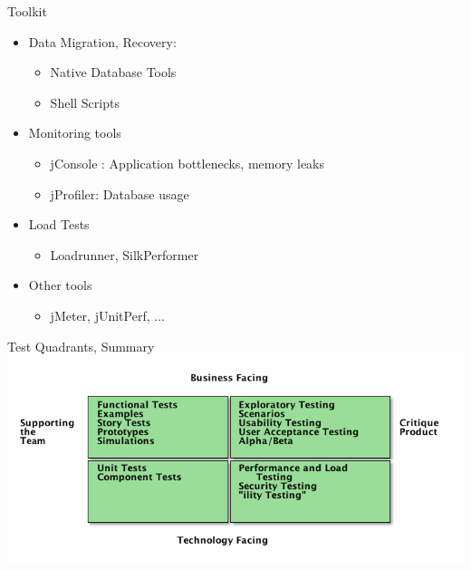 \documentclass[10pt,t,a4paper]{beamer}
\begin{document}
\begin{frame}[label=sec-14]{Toolkit}
\begin{itemize}
\item Data Migration, Recovery:
\begin{itemize}
\item Native Database Tools
\item Shell Scripts
\end{itemize}
\item Monitoring tools
\begin{itemize}
\item jConsole : Application bottlenecks, memory leaks
\item jProfiler: Database usage
\end{itemize}
\item Load Tests
\begin{itemize}
\item Loadrunner, SilkPerformer
\end{itemize}
\item Other tools
\begin{itemize}
\item jMeter, jUnitPerf, $\ldots$
\end{itemize}
\end{itemize}
\end{frame}
\begin{frame}[label=sec-15]{Test Quadrants, Summary}
\includegraphics[width=.9\linewidth]{./FTestQuadrants0.png}
\end{frame}
\end{document}
